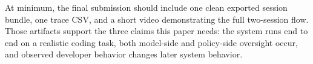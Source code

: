 At minimum, the final submission should include one clean exported session bundle, one trace CSV, and a short video demonstrating the full two-session flow. Those artifacts support the three claims this paper needs: the system runs end to end on a realistic coding task, both model-side and policy-side oversight occur, and observed developer behavior changes later system behavior.
